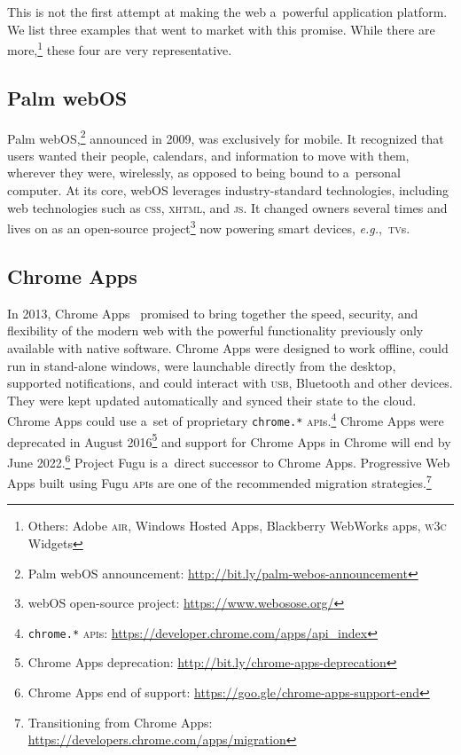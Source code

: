 \documentclass[sigconf]{acmart}
\begin{document}
This is not the first attempt at making the web a~powerful application platform.
We list three examples that went to market with this promise.
While there are more,\footnote{Others: Adobe \textsc{air}, Windows Hosted Apps,
Blackberry WebWorks apps, \textsc{w3c} Widgets} these four are very representative.

\subsection{Palm web\textsc{OS}}

Palm web\textsc{OS},\footnote{Palm web\textsc{OS} announcement:
\url{http://bit.ly/palm-webos-announcement}}
announced in 2009, was exclusively for mobile.
It recognized that users wanted their people, calendars, and information to move with them,
wherever they were, wirelessly, as opposed to being bound to a~personal computer.
At its core, web\textsc{OS} leverages industry-standard technologies,
including web technologies such as \textsc{css}, \textsc{xhtml}, and \textsc{js}.
It changed owners several times and lives on as an open-source
project\footnote{web\textsc{OS} open-source project: \url{https://www.webosose.org/}}
now powering smart devices, \textit{e.g.},\ \textsc{tv}s.

\subsection{Chrome Apps}

In 2013, Chrome Apps~\cite{kay13} promised to bring together the speed, security,
and flexibility of the modern web with the powerful functionality
previously only available with native software. 
Chrome Apps were designed to work offline, could run in stand-alone windows,
were launchable directly from the desktop,
supported notifications, and could interact with \textsc{usb}, Bluetooth and other devices.
They were kept updated automatically and synced their state to the cloud.
Chrome Apps could use a~set of proprietary \texttt{chrome.*}
\textsc{api}s.\footnote{\texttt{chrome.*}
\textsc{api}s: \url{https://developer.chrome.com/apps/api_index}}
Chrome Apps were deprecated in August
2016\footnote{Chrome Apps deprecation:
\url{http://bit.ly/chrome-apps-deprecation}}
and support for Chrome Apps in Chrome will end by
June 2022.\footnote{Chrome Apps end of support:
\url{https://goo.gle/chrome-apps-support-end}}
Project Fugu is a~direct successor to Chrome Apps.
Progressive Web Apps built using Fugu \textsc{api}s
are one of the recommended migration
strategies.\footnote{Transitioning from Chrome Apps: \url{https://developers.chrome.com/apps/migration}}
\end{document}
